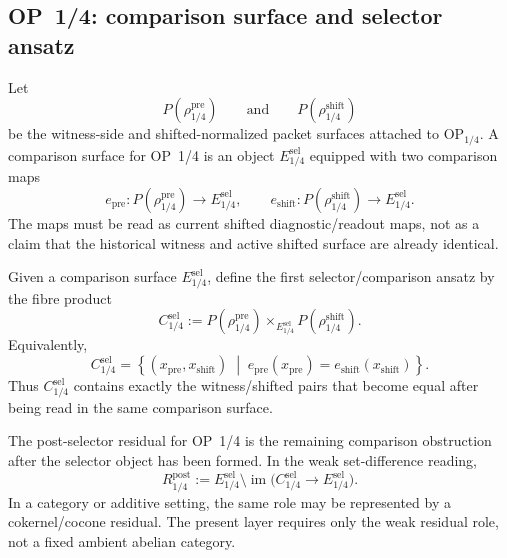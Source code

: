 \subsection{OP~1/4: comparison surface and selector ansatz}
\label{subsec:v410r06-op14-comparison-surface-selector-ansatz}

\begin{definition}
\label{def:v410r06-op14-comparison-surface}
Let
\[
 P(\rho_{1/4}^{\mathrm{pre}})
 \qquad\text{and}\qquad
 P(\rho_{1/4}^{\mathrm{shift}})
\]
be the witness-side and shifted-normalized packet surfaces attached to
\(\mathrm{OP}_{1/4}\). A comparison surface for OP~1/4 is an object
\(E_{1/4}^{\mathrm{sel}}\) equipped with two comparison maps
\[
 e_{\mathrm{pre}}:
 P(\rho_{1/4}^{\mathrm{pre}})\longrightarrow E_{1/4}^{\mathrm{sel}},
 \qquad
 e_{\mathrm{shift}}:
 P(\rho_{1/4}^{\mathrm{shift}})\longrightarrow E_{1/4}^{\mathrm{sel}}.
\]
The maps must be read as current shifted diagnostic/readout maps, not as a claim
that the historical witness and active shifted surface are already identical.
\end{definition}

\begin{definition}
\label{def:v410r06-selector-comparison-object-op14}
Given a comparison surface \(E_{1/4}^{\mathrm{sel}}\), define the first
selector/comparison ansatz by the fibre product
\[
 C_{1/4}^{\mathrm{sel}}
 :=
 P(\rho_{1/4}^{\mathrm{pre}})
 \times_{E_{1/4}^{\mathrm{sel}}}
 P(\rho_{1/4}^{\mathrm{shift}}).
\]
Equivalently,
\[
 C_{1/4}^{\mathrm{sel}}
 =
 \left\{(x_{\mathrm{pre}},x_{\mathrm{shift}})
 \;\middle|\;
 e_{\mathrm{pre}}(x_{\mathrm{pre}})
 =
 e_{\mathrm{shift}}(x_{\mathrm{shift}})
 \right\}.
\]
Thus \(C_{1/4}^{\mathrm{sel}}\) contains exactly the witness/shifted pairs that
become equal after being read in the same comparison surface.
\end{definition}

\begin{definition}
\label{def:v410r06-post-selector-residual}
The post-selector residual for OP~1/4 is the remaining comparison obstruction
after the selector object has been formed. In the weak set-difference reading,
\[
 R_{1/4}^{\mathrm{post}}
 :=
 E_{1/4}^{\mathrm{sel}}
 \setminus
 \operatorname{im}\bigl(C_{1/4}^{\mathrm{sel}}\to E_{1/4}^{\mathrm{sel}}\bigr).
\]
In a category or additive setting, the same role may be represented by a
cokernel/cocone residual. The present layer requires only the weak residual
role, not a fixed ambient abelian category.
\end{definition}

